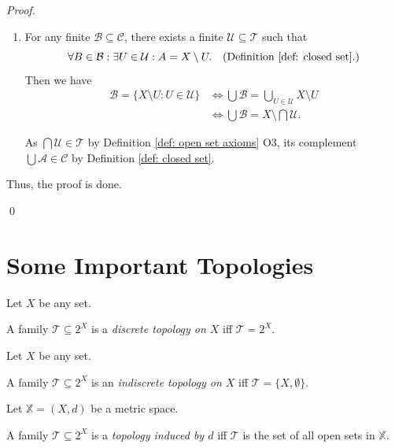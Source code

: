 \begin{proposition}
\begin{proof}
\begin{enumerate}[\bf C1.]
				\qedlm
				
			\item
			For any finite $\mathcal B \subseteq \mathcal C$, there exists a finite $\mathcal U \subseteq \mathcal T$ such that
			$$
			\forall B \in \mathcal B: \exists U \in \mathcal U: A = X \setminus U. \quad
			(\text{Definition \ref{def: closed set}}.)
			$$
			Then we have
			$$
			\begin{aligned}
				\mathcal B = \{X \setminus U : U \in \mathcal U \} &\iff \bigcup \mathcal B =  \bigcup_{U \in \mathcal U} X \setminus U \\
				&\iff \bigcup \mathcal B = X \setminus \bigcap \mathcal U.
			\end{aligned}
			$$
			
			As $\bigcap \mathcal U \in \mathcal T$ by Definition \ref{def: open set axioms} O3, its complement $\bigcup \mathcal A \in \mathcal C$ by Definition \ref{def: closed set}.
			
			\qedlm
		\end{enumerate}
		
		Thus, the proof is done.
		
		\qed
	\end{proof}
\end{proposition}


\section{Some Important Topologies}


\begin{definition}
	\label{def: discrete topology}
	Let $X$ be any set.
	
	A family $\mathcal T \subseteq 2^X$ is a \textit{discrete topology on $X$} iff $\mathcal T = 2^X$.
\end{definition}


\begin{definition}
	\label{def: indiscrete topology}
	Let $X$ be any set.
	
	A family $\mathcal T \subseteq 2^X$ is an \textit{indiscrete topology on $X$} iff $\mathcal T = \{X, \emptyset\}$.
\end{definition}


\begin{definition}
	\label{def: induced topology}
	Let $\mathbb X = (X, d)$ be a metric space.
	
	A family $\mathcal T \subseteq 2^X$ is a \textit{topology induced by $d$} iff $\mathcal T$ is the set of all open sets in $\mathbb X$.
\end{definition}


